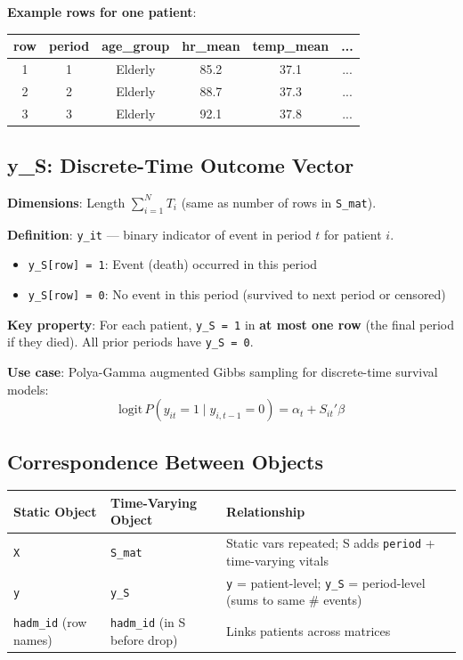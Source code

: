 \documentclass[11pt]{article}
\begin{document}
\textbf{Example rows for one patient}:
\begin{center}
\begin{tabular}{cccccc}
\toprule
\textbf{row} & \textbf{period} & \textbf{age\_group} & \textbf{hr\_mean} & \textbf{temp\_mean} & \textbf{...} \\
\midrule
1 & 1 & Elderly & 85.2 & 37.1 & ... \\
2 & 2 & Elderly & 88.7 & 37.3 & ... \\
3 & 3 & Elderly & 92.1 & 37.8 & ... \\
\bottomrule
\end{tabular}
\end{center}

\subsection{y\_S: Discrete-Time Outcome Vector}

\textbf{Dimensions}: Length $\sum_{i=1}^{N} T_i$ (same as number of rows in \texttt{S\_mat}).

\textbf{Definition}: \texttt{y\_it} --- binary indicator of event in period $t$ for patient $i$.
\begin{itemize}[nosep]
    \item \texttt{y\_S[row] = 1}: Event (death) occurred in this period
    \item \texttt{y\_S[row] = 0}: No event in this period (survived to next period or censored)
\end{itemize}

\textbf{Key property}: For each patient, \texttt{y\_S = 1} in \textbf{at most one row} (the final period if they died). All prior periods have \texttt{y\_S = 0}.

\textbf{Use case}: Polya-Gamma augmented Gibbs sampling for discrete-time survival models:
\[
\text{logit}\, P(y_{it} = 1 \mid y_{i,t-1} = 0) = \alpha_t + S_{it}' \beta
\]

\subsection{Correspondence Between Objects}

\begin{center}
\begin{tabular}{lll}
\toprule
\textbf{Static Object} & \textbf{Time-Varying Object} & \textbf{Relationship} \\
\midrule
\texttt{X} & \texttt{S\_mat} & Static vars repeated; S adds \texttt{period} + time-varying vitals \\
\texttt{y} & \texttt{y\_S} & \texttt{y} = patient-level; \texttt{y\_S} = period-level (sums to same \# events) \\
\texttt{hadm\_id} (row names) & \texttt{hadm\_id} (in S before drop) & Links patients across matrices \\
\bottomrule
\end{tabular}
\end{center}
\end{document}
